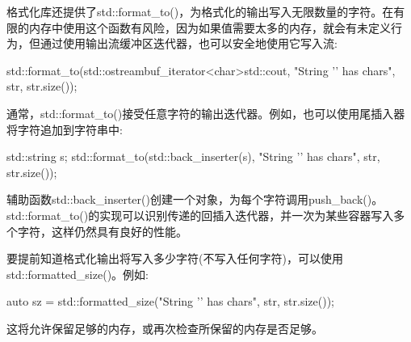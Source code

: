 
格式化库还提供了std::format\_to()，为格式化的输出写入无限数量的字符。在有限的内存中使用这个函数有风险，因为如果值需要太多的内存，就会有未定义行为，但通过使用输出流缓冲区迭代器，也可以安全地使用它写入流:

\begin{cpp}
std::format_to(std::ostreambuf_iterator<char>{std::cout},
				"String '{}' has {} chars\n", str, str.size());
\end{cpp}

通常，std::format\_to()接受任意字符的输出迭代器。例如，也可以使用尾插入器将字符追加到字符串中:

\begin{cpp}
std::string s;
std::format_to(std::back_inserter(s),
				"String '{}' has {} chars\n", str, str.size());
\end{cpp}

辅助函数std::back\_inserter()创建一个对象，为每个字符调用push\_back()。std::format\_to()的实现可以识别传递的回插入迭代器，并一次为某些容器写入多个字符，这样仍然具有良好的性能。


要提前知道格式化输出将写入多少字符(不写入任何字符)，可以使用std::formatted\_size()。例如:

\begin{cpp}
auto sz = std::formatted_size("String '{}' has {} chars\n", str, str.size());
\end{cpp}

这将允许保留足够的内存，或再次检查所保留的内存是否足够。






